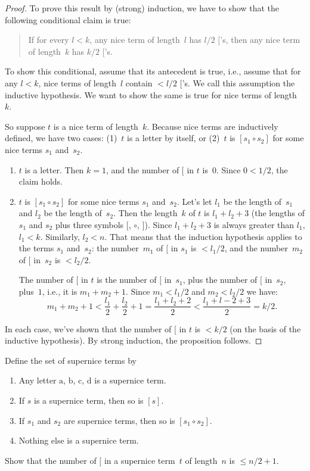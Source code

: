 \documentclass[../../../include/open-logic-section]{subfiles}
\begin{document}
\begin{proof}
To prove this result by (strong) induction, we have to show that the
following conditional claim is true:
\begin{quote}
  If for every $l < k$, any nice term of length~$l$ has $l/2$
  $[$'s, then any nice term of length~$k$ has $k/2$ $[$'s.
\end{quote}
To show this conditional, assume that its antecedent is true, i.e.,
assume that for any $l<k$, nice terms of length~$l$ contain $< l/2$
$[$'s.  We call this assumption the inductive hypothesis. We want to
show the same is true for nice terms of length~$k$.

So suppose $t$ is a nice term of length~$k$.  Because nice terms are
inductively defined, we have two cases: (1)~$t$ is a letter by
itself, or (2)~$t$ is $[s_1 \circ s_2]$ for some nice terms $s_1$ and~$s_2$.
\begin{enumerate}
\item $t$ is a letter.  Then $k = 1$, and the number of $[$ in $t$
is~$0$. Since $0 < 1/2$, the claim holds.
\item $t$ is $[s_1 \circ s_2]$ for some nice terms $s_1$ and~$s_2$.
  Let's let $l_1$ be the length of~$s_1$ and $l_2$ be the length
  of~$s_2$.  Then the length~$k$ of $t$ is $l_1+l_2+3$ (the lengths of
  $s_1$ and $s_2$ plus three symbols $[$, $\circ$, $]$). Since
  $l_1+l_2+3$ is always greater than $l_1$, $l_1 < k$. Similarly, $l_2
  < n$. That means that the induction hypothesis applies to the terms
  $s_1$ and~$s_2$: the number~$m_1$ of $[$ in $s_1$ is $< l_1/2$, and
  the number~$m_2$ of $[$ in~$s_2$ is $< l_2/2$.

  The number of $[$ in $t$ is the number of $[$ in~$s_1$, plus the
  number of $[$ in~$s_2$, plus~$1$, i.e., it is $m_1 + m_2 + 1$. Since $m_1
  < l_1/2$ and $m_2 < l_2/2$ we have:
  \[
  m_1 + m_2 + 1 < \frac{l_1}{2} + \frac{l_2}{2} + 1 = \frac{l_1+l_2+2}{2} < \frac{l_1+l-2+3}{2} = k/2.
  \]
\end{enumerate}
In each case, we've shown that the number of $[$ in $t$ is $< k/2$ (on
the basis of the inductive hypothesis). By strong induction, the
proposition follows.
\end{proof}

\begin{prob}
  Define the set of supernice terms by
  \begin{enumerate}
  \item Any letter $\mathrm{a}$, $\mathrm{b}$, $\mathrm{c}$,
    $\mathrm{d}$ is a supernice term.
  \item If $s$ is a supernice term, then so is $[s]$.
  \item If $s_1$ and $s_2$ are supernice terms, then so
    is $[s_1 \circ s_2]$.
  \item Nothing else is a supernice term.
  \end{enumerate}
  Show that the number of $[$ in a supernice term~$t$ of length~$n$ is
    $\le n/2 +1$.
\end{prob}
\end{document}
